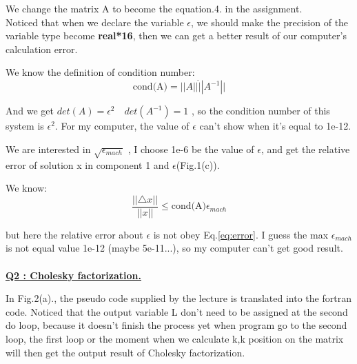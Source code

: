 \documentclass{article}
\begin{document}
We change the matrix A to become the equation.4. in the assignment.\\
Noticed that when we declare the variable $\epsilon$, we should make the precision of the variable type become \textbf{real*16}, then we can get a better result of our computer's calculation error.

We know the definition of condition number:
\begin{equation}
    \mbox{cond(A)}=||A||\dot||A^{-1}||
    \label{eq:cond}
\end{equation}

And we get $det(A)=\epsilon^2 \quad det(A^{-1})=1$ , so the condition number of this system is $\epsilon^2$.
For my computer, the value of $\epsilon$ can't show when it's equal to 1e-12.

We are interested in $\sqrt{\epsilon_{mach}}$ , I choose 1e-6 be the value of $\epsilon$, and get the relative error of solution x in component 1 and $\epsilon$(Fig.1(c)).

We know:
\begin{equation}
    \frac{||\triangle x||}{||x||}\leq\mbox{cond(A)}
    \epsilon_{mach}
    \label{eq:error}
\end{equation}

but here the relative error about $\epsilon$ is not obey Eq.\ref{eq:error}. I guess the max $\epsilon_{mach}$ is not equal value 1e-12 (maybe 5e-11...), so my computer can't get good result.\\ \\
\underline{\textbf{Q2 : Cholesky factorization.\\}}

In Fig.2(a)., the pseudo code supplied by the lecture is translated into the fortran code. Noticed that the output variable L don't need to be assigned at the second do loop, because it doesn't finish the process yet when program go to the second loop, the first loop or the moment when we calculate k,k position on the matrix will then get the output result of Cholesky factorization.\\
\end{document}
